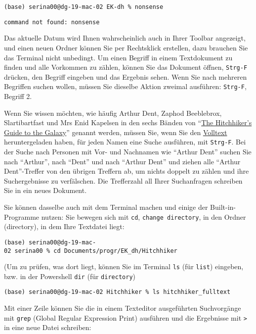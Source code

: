 \documentclass[
  letterpaper,
]{book}
\begin{document}
\texttt{(base)\ serina00@dg-19-mac-02\ EK-dh\ \%\ nonsense}

\texttt{command\ not\ found:\ nonsense}

Das aktuelle Datum wird Ihnen wahrscheinlich auch in Ihrer Toolbar
angezeigt, und einen neuen Ordner können Sie per Rechtsklick erstellen,
dazu brauchen Sie das Terminal nicht unbedingt. Um einen Begriff in
einem Textdokument zu finden und alle Vorkommen zu zählen, können Sie
das Dokument öffnen, \texttt{Strg-F} drücken, den Begriff eingeben und
das Ergebnis sehen. Wenn Sie nach mehreren Begriffen suchen wollen,
müssen Sie dieselbe Aktion zweimal ausführen: \texttt{Strg-F}, Begriff
2.

Wenn Sie wissen möchten, wie häufig Arthur Dent, Zaphod Beeblebrox,
Slartibartfast und Mrs Enid Kapelsen in den sechs Bänden von
``\href{https://en.wikipedia.org/wiki/The_Hitchhiker\%27s_Guide_to_the_Galaxy}{The
Hitchhiker's Guide to the Galaxy}'' genannt werden, müssen Sie, wenn Sie
den
\href{https://archive.org/stream/TheultimateHitchhikersGuide/The\%20Hitchhiker\%27s\%20Guide\%20To\%20The\%20Galaxy_djvu.txt}{Volltext}
heruntergeladen haben, für jeden Namen eine Suche ausführen, mit
\texttt{Strg-F}. Bei der Suche nach Personen mit Vor- und Nachnamen wie
``Arthur Dent'' suchen Sie nach ``Arthur'', nach ``Dent'' und nach
``Arthur Dent'' und ziehen alle ``Arthur Dent''-Treffer von den übrigen
Treffern ab, um nichts doppelt zu zählen und ihre Suchergebnisse zu
verfälschen. Die Trefferzahl all Ihrer Suchanfragen schreiben Sie in ein
neues Dokument.

Sie können dasselbe auch mit dem Terminal machen und einige der
Built-in-Programme nutzen: Sie bewegen sich mit \texttt{cd},
\texttt{change\ directory}, in den Ordner (directory), in dem Ihre
Textdatei liegt:

\texttt{(base)\ serina00@dg-19-mac-02\ serina00\ \%\ cd\ Documents/progr/EK\_dh/Hitchhiker}

(Um zu prüfen, was dort liegt, können Sie im Terminal \texttt{ls} (für
\texttt{list}) eingeben, bzw. in der Powershell \texttt{dir} (für
\texttt{directory})

\texttt{(base)\ serina00@dg-19-mac-02\ Hitchhiker\ \%\ ls\ hitchhiker\_fulltext}

Mit einer Zeile können Sie die in einem Texteditor ausgeführten
Suchvorgänge mit \texttt{grep} (Global Regular Expression Print)
ausführen und die Ergebnisse mit \texttt{\textgreater{}} in eine neue
Datei schreiben:

\appendix
{}
\end{document}
